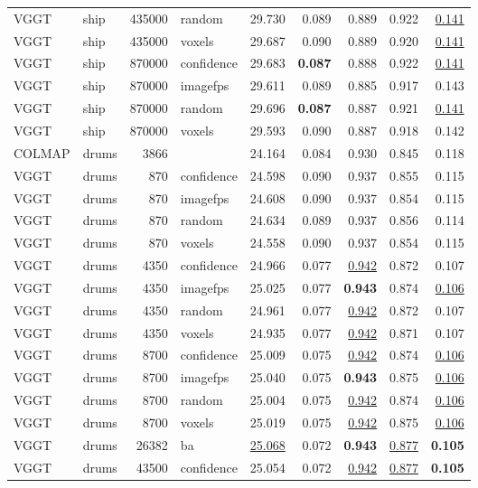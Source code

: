 \begin{table}[H]
\begin{tabular}{llrlrrrrr}
VGGT & ship & 435000 & random & 29.730 & 0.089 & 0.889 & 0.922 & \underline{0.141} \\
VGGT & ship & 435000 & voxels & 29.687 & 0.090 & 0.889 & 0.920 & \underline{0.141} \\
VGGT & ship & 870000 & confidence & 29.683 & \textbf{0.087} & 0.888 & 0.922 & \underline{0.141} \\
VGGT & ship & 870000 & imagefps & 29.611 & 0.089 & 0.885 & 0.917 & 0.143 \\
VGGT & ship & 870000 & random & 29.696 & \textbf{0.087} & 0.887 & 0.921 & \underline{0.141} \\
VGGT & ship & 870000 & voxels & 29.593 & 0.090 & 0.887 & 0.918 & 0.142 \\
\midrule
COLMAP & drums & 3866 &  & 24.164 & 0.084 & 0.930 & 0.845 & 0.118 \\
VGGT & drums & 870 & confidence & 24.598 & 0.090 & 0.937 & 0.855 & 0.115 \\
VGGT & drums & 870 & imagefps & 24.608 & 0.090 & 0.937 & 0.854 & 0.115 \\
VGGT & drums & 870 & random & 24.634 & 0.089 & 0.937 & 0.856 & 0.114 \\
VGGT & drums & 870 & voxels & 24.558 & 0.090 & 0.937 & 0.854 & 0.115 \\
VGGT & drums & 4350 & confidence & 24.966 & 0.077 & \underline{0.942} & 0.872 & 0.107 \\
VGGT & drums & 4350 & imagefps & 25.025 & 0.077 & \textbf{0.943} & 0.874 & \underline{0.106} \\
VGGT & drums & 4350 & random & 24.961 & 0.077 & \underline{0.942} & 0.872 & 0.107 \\
VGGT & drums & 4350 & voxels & 24.935 & 0.077 & \underline{0.942} & 0.871 & 0.107 \\
VGGT & drums & 8700 & confidence & 25.009 & 0.075 & \underline{0.942} & 0.874 & \underline{0.106} \\
VGGT & drums & 8700 & imagefps & 25.040 & 0.075 & \textbf{0.943} & 0.875 & \underline{0.106} \\
VGGT & drums & 8700 & random & 25.004 & 0.075 & \underline{0.942} & 0.874 & \underline{0.106} \\
VGGT & drums & 8700 & voxels & 25.019 & 0.075 & \underline{0.942} & 0.875 & \underline{0.106} \\
VGGT & drums & 26382 & ba & \underline{25.068} & 0.072 & \textbf{0.943} & \underline{0.877} & \textbf{0.105} \\
VGGT & drums & 43500 & confidence & 25.054 & 0.072 & \underline{0.942} & \underline{0.877} & \textbf{0.105} \\

\end{tabular}
\end{table}
